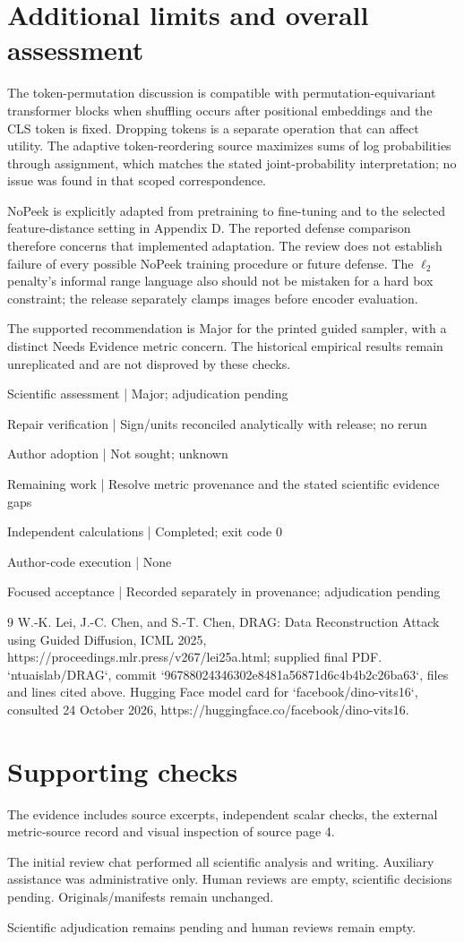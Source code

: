 \documentclass[10pt]{article}
\begin{document}
\section*{Additional limits and overall assessment}
The token-permutation discussion is compatible with permutation-equivariant transformer blocks when shuffling occurs after positional embeddings and the CLS token is fixed. Dropping tokens is a separate operation that can affect utility. The adaptive token-reordering source maximizes sums of log probabilities through assignment, which matches the stated joint-probability interpretation; no issue was found in that scoped correspondence.\par
NoPeek is explicitly adapted from pretraining to fine-tuning and to the selected feature-distance setting in Appendix D. The reported defense comparison therefore concerns that implemented adaptation. The review does not establish failure of every possible NoPeek training procedure or future defense. The \(\ell_2\) penalty’s informal range language also should not be mistaken for a hard box constraint; the release separately clamps images before encoder evaluation.\par
The supported recommendation is Major for the printed guided sampler, with a distinct Needs Evidence metric concern. The historical empirical results remain unreplicated and are not disproved by these checks.\par
Scientific assessment | Major; adjudication pending\par
Repair verification | Sign/units reconciled analytically with release; no rerun\par
Author adoption | Not sought; unknown\par
Remaining work | Resolve metric provenance and the stated scientific evidence gaps\par
Independent calculations | Completed; exit code 0\par
Author-code execution | None\par
Focused acceptance | Recorded separately in provenance; adjudication pending\par
9 W.-K. Lei, J.-C. Chen, and S.-T. Chen, DRAG: Data Reconstruction Attack using Guided Diffusion, ICML 2025, https://proceedings.mlr.press/v267/lei25a.html; supplied final PDF. `ntuaislab/DRAG`, commit `96788024346302e8481a56871d6c4b4b2c26ba63`, files and lines cited above. Hugging Face model card for `facebook/dino-vits16`, consulted 24 October 2026, https://huggingface.co/facebook/dino-vits16.\par
\section*{Supporting checks}
The evidence includes source excerpts, independent scalar checks, the external metric-source record and visual inspection of source page 4.\par
The initial review chat performed all scientific analysis and writing. Auxiliary assistance was administrative only. Human reviews are empty, scientific decisions pending. Originals/manifests remain unchanged.\par
Scientific adjudication remains pending and human reviews remain empty.\par
\end{document}
